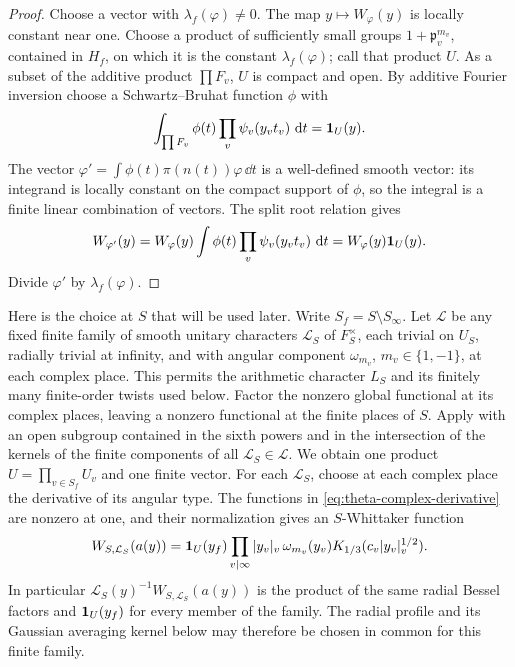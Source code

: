 \begin{proof}
Choose a vector with \(\lambda_f(\varphi)\ne0\).  The map
\(y\mapsto W_\varphi(y)\) is locally constant near one.  Choose a
product of sufficiently small groups \(1+\mathfrak p_v^{m_v}\),
contained in \(H_f\), on which it is the constant
\(\lambda_f(\varphi)\); call that product \(U\).  As a subset of the
additive product \(\prod F_v\), \(U\) is compact and open.
By additive Fourier inversion choose a Schwartz--Bruhat function
\(\phi\) with
\[
 \int_{\prod F_v}\phi(t)\prod_v\psi_v(y_vt_v)\,\,\mathrm{d} t=\mathbf{1}_U(y).
\]
The vector \(\varphi'=\int\phi(t)\pi(n(t))\varphi\,\dd t\) is a
well-defined smooth vector: its integrand is locally constant on the
compact support of \(\phi\), so the integral is a finite linear
combination of vectors.  The split root relation gives
\[
 W_{\varphi'}(y)
 =W_\varphi(y)\int\phi(t)\prod_v\psi_v(y_vt_v)\,\,\mathrm{d} t
 =W_\varphi(y)\mathbf{1}_U(y).
\]
Divide \(\varphi'\) by \(\lambda_f(\varphi)\).
\end{proof}

Here is the choice at \(S\) that will be used later.  Write
\(S_f=S\setminus S_\infty\).  Let \(\mathscr L\) be any fixed finite
family of smooth unitary characters \(\mathcal L_S\) of
\(F_S^\times\), each trivial on \(U_S\), radially trivial at infinity,
and with angular component \(\omega_{m_v}\), \(m_v\in\{1,-1\}\), at
each complex place.  This permits the arithmetic character \(L_S\)
and its finitely many finite-order twists used below.  Factor the
nonzero global functional at its complex places, leaving a nonzero
functional at the finite places of \(S\).  Apply
 with an open subgroup contained in
the sixth powers and in the intersection of the kernels of the finite
components of all \(\mathcal L_S\in\mathscr L\).  We obtain one product
\(U=\prod_{v\in S_f}U_v\) and one finite vector.  For each
\(\mathcal L_S\), choose at each complex place the derivative of its
angular type.  The functions in \eqref{eq:theta-complex-derivative}
are nonzero at one, and their normalization gives an \(S\)-Whittaker
function
\begin{equation}\label{eq:theta-chosen-S-function}
 W_{S,\mathcal L_S}(a(y))=\mathbf{1}_U(y_f)
   \prod_{v\mid\infty}|y_v|_v\,\omega_{m_v}(y_v)
                      K_{1/3}(c_v|y_v|_v^{1/2}).
\end{equation}
In particular \(\mathcal L_S(y)^{-1}W_{S,\mathcal L_S}(a(y))\) is the
product of the same radial Bessel factors and \(\mathbf{1}_U(y_f)\) for
every member of the family.  The radial profile and its Gaussian
averaging kernel below may therefore be chosen in common for this
finite family.

